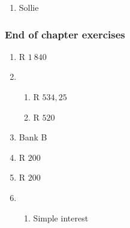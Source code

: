 {\begin{multicols}{3}
\begin{enumerate}[noitemsep, label=\textbf{\arabic*}.]
\begin{enumerate}[noitemsep, label=\textbf{(\alph*)} ]
	    \item Sollie %
	\end{enumerate}
    \end{enumerate}



\subsubsection*{End of chapter exercises} %

    \begin{enumerate}[label=\textbf{\arabic*}.]
	\item R $1 ~840$%

	\item %
	\begin{enumerate}[noitemsep, label=\textbf{(\alph*)} ]
	    \item R $534,25$%
	    \item R $520$%
	\end{enumerate}

	\item Bank B%

	\item R $200$ %

	\item R $200$ %

	\item %
	\begin{enumerate}[noitemsep, label=\textbf{(\alph*)} ]
	    \item Simple interest%


\end{enumerate}
\end{enumerate}
\end{multicols}}
